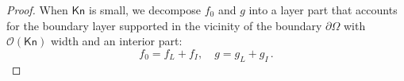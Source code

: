 \documentclass[english,reqno]{amsart}
\theoremstyle{plain}
\theoremstyle{definition} %
\newcommand{\average}[1]{ \langle#1 \rangle}
\newcommand{\Kn}{\mathsf{Kn}}
\newcommand{\bottom}{\left( \frac{\sigma_{s0}}{\Kn} + \Kn \sigma_a \right)^2}
\begin{document}
\begin{proof}
When $\Kn$ is small, we decompose $f_0$ and $g$ into a layer part that accounts for the boundary layer supported in the vicinity of the boundary $\partial \Omega$ with $\mathcal{O}(\Kn)$ width and an interior part:
\begin{equation*}
f_0 = f_L + f_I, \quad g = g_L + g_I\,.
\end{equation*}

\iffalse
First, since $f_0$ and $g$ solve \eqref{eqn:RTE_sca_0} and \eqref{eqn:RTE_sca_g} respectively, we have
\begin{eqnarray*}
f_0 g &=& \frac{1}{\bottom} \left[ \left( \frac{\sigma_{s0}}{\Kn} \average{f_0} - v \cdot \nabla_x f_0 \right) 
                                               \left(\frac{\sigma_{s0}}{\Kn} \average{g} + v \cdot \nabla_x g \right) \right] \nonumber
\\ &=&  \frac{\frac{\sigma^2_{s0}}{\Kn^2}\average{f_0}\average{g} }{\bottom}  - \frac{ \frac{\sigma_{s0}}{\Kn} (v\cdot \nabla_x f_0 \average{g} - v\cdot \nabla_x g \average{f_0})}{\bottom}   - \frac{(v\cdot \nabla_x f_0)(v\cdot \nabla_x g)}{\bottom} 
\\ &=&    \frac{\frac{\sigma^2_{s0}}{\Kn^2}\average{f_0}\average{g} }{\bottom} + \mathcal{O}(\Kn) + \mathcal{O}(\Kn^2)\,.                     
\end{eqnarray*}
Therefore,
\begin{eqnarray}
\gamma_\Kn = \frac{1}{\Kn}(\average{f_0}\average{g} - \average{f_0g}) = \frac{1}{\Kn} \frac{\left( \frac{\sigma_{s0}}{\Kn} + \Kn \sigma_a\right)^2 - \frac{\sigma_{s0}^2}{\Kn^2}}{\bottom} \average{f_0}\average{g} + \mathcal{O}(1+\Kn) \sim \mathcal{O}(1)\,.
\end{eqnarray}
\fi



\end{proof}
\end{document}
